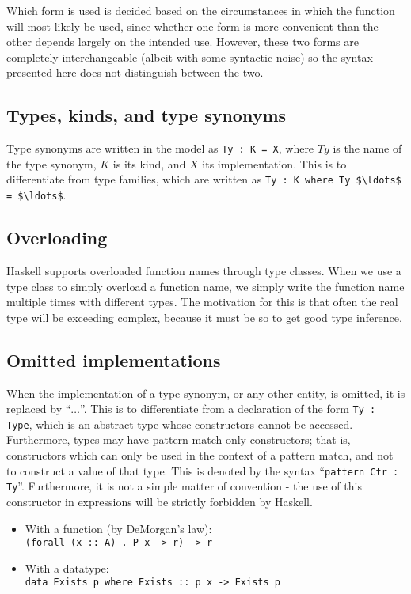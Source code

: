 Which form is used is decided based on the circumstances in which the function
will most likely be used, since whether one form is more convenient than the
other depends largely on the intended use. However, these two forms are
completely interchangeable (albeit with some syntactic noise) so the syntax
presented here does not distinguish between the two. 

\subsection*{Types, kinds, and type synonyms}

Type synonyms are written in the model as \lstinline!Ty : K = X!, where $Ty$ is 
the name
of the type synonym, $K$ is its kind, and $X$ its implementation. This is to 
differentiate
from type families, which are written as 
\lstinline!Ty : K where Ty $\ldots$ = $\ldots$!.

\subsection*{Overloading}

Haskell supports overloaded function names through type classes. When we use a 
type 
class to simply overload a function name, we simply write the function name
multiple times with different types. The motivation for this is that often the 
real type will be exceeding complex, because it must be so to get good type 
inference. 



\subsection*{Omitted implementations}

When the implementation of a type synonym, or any other entity, is omitted, it
is replaced by ``$\ldots$''. This is to differentiate from a declaration of the 
form
\lstinline!Ty : Type!, which is an abstract type whose constructors cannot be
accessed. Furthermore, types may have pattern-match-only constructors; that is,
constructors which can only be used in the context of a pattern match, and not
to construct a value of that type. This is denoted by the syntax
``\lstinline!pattern Ctr : Ty!''. Furthermore, it is not a simple matter of
convention - the use of this constructor in expressions will be strictly
forbidden by Haskell.


\begin{itemize}
\item With a function (by DeMorgan's law): \\ \texttt{(forall (x :: A) . P 
x -> r) -> r}
\item With a datatype: \\ \texttt{data Exists p where Exists :: p x -> 
Exists p}
\end{itemize} 

